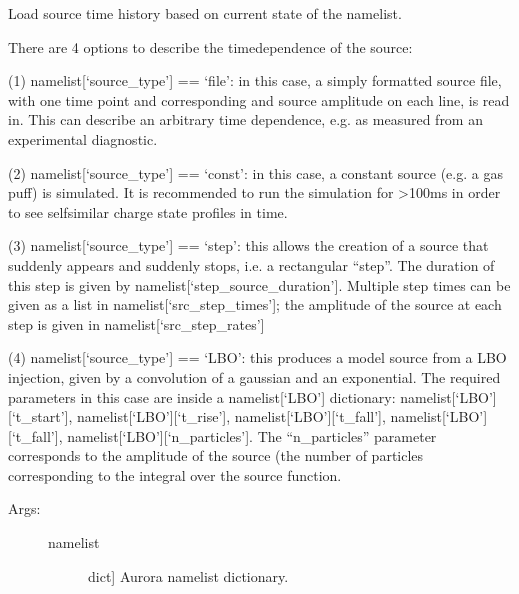 \documentclass[letterpaper,10pt,english]{sphinxmanual}
\begin{document}

\begin{fulllineitems}
\label{\detokenize{aurora:aurora.source_utils.get_source_time_history}}
Load source time history based on current state of the namelist.

There are 4 options to describe the time\sphinxhyphen{}dependence of the source:

(1) namelist{[}‘source\_type’{]} == ‘file’: in this case, a simply formatted 
source file, with one time point and corresponding and source amplitude on each
line, is read in. This can describe an arbitrary time dependence, e.g. 
as measured from an experimental diagnostic.

(2) namelist{[}‘source\_type’{]} == ‘const’: in this case, a constant source 
(e.g. a gas puff) is simulated. It is recommended to run the simulation for 
\textgreater{}100ms in order to see self\sphinxhyphen{}similar charge state profiles in time.

(3) namelist{[}‘source\_type’{]} == ‘step’: this allows the creation of a source
that suddenly appears and suddenly stops, i.e. a rectangular “step”. The 
duration of this step is given by namelist{[}‘step\_source\_duration’{]}. Multiple 
step times can be given as a list in namelist{[}‘src\_step\_times’{]}; the amplitude
of the source at each step is given in namelist{[}‘src\_step\_rates’{]}

(4) namelist{[}‘source\_type’{]} == ‘LBO’: this produces a model source from a LBO
injection, given by a convolution of a gaussian and an exponential. The required 
parameters in this case are inside a namelist{[}‘LBO’{]} dictionary:
namelist{[}‘LBO’{]}{[}‘t\_start’{]}, namelist{[}‘LBO’{]}{[}‘t\_rise’{]}, namelist{[}‘LBO’{]}{[}‘t\_fall’{]}, 
namelist{[}‘LBO’{]}{[}‘t\_fall’{]}, namelist{[}‘LBO’{]}{[}‘n\_particles’{]}. The “n\_particles” parameter
corresponds to the amplitude of the source (the number of particles corresponding
to the integral over the source function.
\begin{description}
\item[{Args:}] \leavevmode\begin{description}
\item[{namelist}] \leavevmode{[}dict{]}
Aurora namelist dictionary.


\end{description}
\end{description}
\end{fulllineitems}
\end{document}
